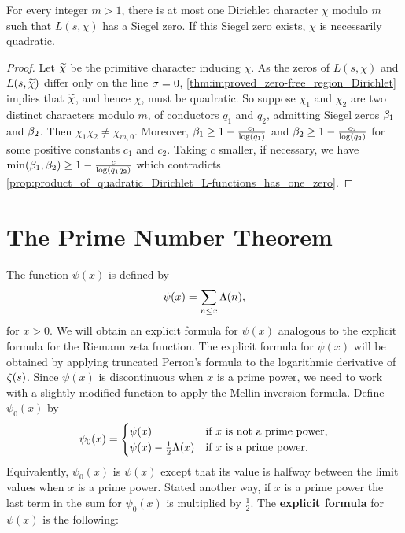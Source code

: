     \begin{proposition}\label{prop:at_most_one_Siegel_zero_per_modulus}
      For every integer $m > 1$, there is at most one Dirichlet character $\chi$ modulo $m$ such that $L(s,\chi)$ has a Siegel zero. If this Siegel zero exists, $\chi$ is necessarily quadratic.
    \end{proposition}
    \begin{proof}
      Let $\widetilde{\chi}$ be the primitive character inducing $\chi$. As the zeros of $L(s,\chi)$ and $L(s,\widetilde{\chi})$ differ only on the line $\sigma = 0$, \cref{thm:improved_zero-free_region_Dirichlet} implies that $\widetilde{\chi}$, and hence $\chi$, must be quadratic. So suppose $\chi_{1}$ and $\chi_{2}$ are two distinct characters modulo $m$, of conductors $q_{1}$ and $q_{2}$, admitting Siegel zeros $\beta_{1}$ and $\beta_{2}$. Then $\chi_{1}\chi_{2} \neq \chi_{m,0}$. Moreover, $\beta_{1} \ge 1-\frac{c_{1}}{\log(q_{1})}$ and $\beta_{2} \ge 1-\frac{c_{2}}{\log(q_{2})}$ for some positive constants $c_{1}$ and $c_{2}$. Taking $c$ smaller, if necessary, we have $\min(\beta_{1},\beta_{2}) \ge 1-\frac{c}{\log(q_{1}q_{2})}$ which contradicts \cref{prop:product_of_quadratic_Dirichlet_L-functions_has_one_zero}.
    \end{proof}
  \section{The Prime Number Theorem}
    The function $\psi(x)$ is defined by
    \[
      \psi(x) = \sum_{n \le x}\Lambda(n),
    \]
    for $x > 0$. We will obtain an explicit formula for $\psi(x)$ analogous to the explicit formula for the Riemann zeta function. The explicit formula for $\psi(x)$ will be obtained by applying truncated Perron's formula to the logarithmic derivative of $\zeta(s)$. Since $\psi(x)$ is discontinuous when $x$ is a prime power, we need to work with a slightly modified function to apply the Mellin inversion formula. Define $\psi_{0}(x)$ by
    \[
      \psi_{0}(x) = \begin{cases} \psi(x) & \text{if $x$ is not a prime power}, \\ \psi(x)-\frac{1}{2}\Lambda(x) & \text{if $x$ is a prime power}. \end{cases}
    \]
    Equivalently, $\psi_{0}(x)$ is $\psi(x)$ except that its value is halfway between the limit values when $x$ is a prime power. Stated another way, if $x$ is a prime power the last term in the sum for $\psi_{0}(x)$ is multiplied by $\frac{1}{2}$. The \textbf{explicit formula} for $\psi(x)$ is the following:

